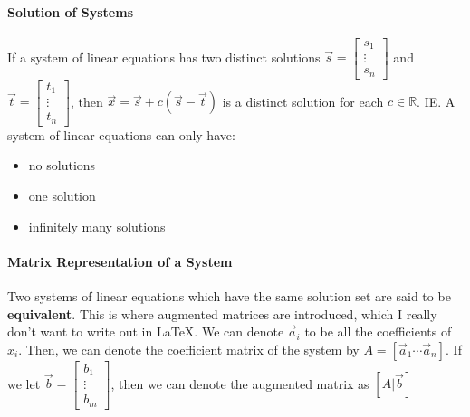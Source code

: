 \documentclass[10pt,letter]{article}
\begin{document}
\paragraph{Solution of Systems} If a system of linear equations has two distinct solutions $\vec{s}=\begin{bmatrix}s_1\\\vdots\\s_n\end{bmatrix}$ and $\vec{t}=\begin{bmatrix}t_1\\\vdots\\t_n\end{bmatrix}$, then $\vec{x}=\vec{s}+c(\vec{s}-\vec{t})$ is a distinct solution for each $c\in\mathbb{R}$. IE. A system of linear equations can only have: \begin{itemize}
    \item no solutions
    \item one solution 
    \item infinitely many solutions
\end{itemize}

\paragraph{Matrix Representation of a System} Two systems of linear equations which have the same solution set are said to be \textbf{equivalent}. This is where augmented matrices are introduced, which I really don't want to write out in LaTeX. We can denote $\vec{a}_i$ to be all the coefficients of $x_i$. Then, we can denote the coefficient matrix of the system by $A=[\vec{a}_1\cdots\vec{a}_n]$. If we let $\vec{b}=\begin{bmatrix}b_1\\\vdots\\b_m\end{bmatrix}$, then we can denote the augmented matrix as $[A|\vec{b}]$\\
\end{document}
